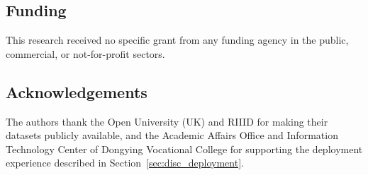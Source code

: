 \documentclass[sn-mathphys,Numbered]{sn-jnl}
\begin{document}
\subsection*{Funding}
This research received no specific grant from any funding agency in the public, commercial, or not-for-profit sectors.

\subsection*{Acknowledgements}
The authors thank the Open University (UK) and RIIID for making their datasets publicly available, and the Academic Affairs Office and Information Technology Center of Dongying Vocational College for supporting the deployment experience described in Section~\ref{sec:disc_deployment}.

\end{document}
